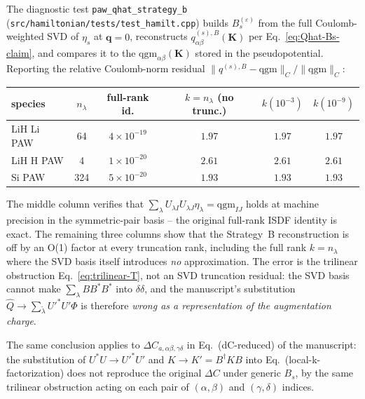 \documentclass[aps,prb,reprint,superscriptaddress,nofootinbib]{revtex4-2}
\newcommand{\bq}{\mathbf q}
\begin{document}
The diagnostic test \texttt{paw\_qhat\_strategy\_b}
(\texttt{src/hamiltonian/tests/test\_hamilt.cpp}) builds
\(B_s^{(\varepsilon)}\) from the full Coulomb-weighted SVD of
\(\eta_s\) at \(\bq=0\), reconstructs
\(q^{(s),B}_{\alpha\beta}(\mathbf K)\) per
Eq.~\eqref{eq:Qhat-Bs-claim}, and compares it to the
\(\mathrm{qgm}_{\alpha\beta}(\mathbf K)\) stored in the pseudopotential.
Reporting the relative Coulomb-norm residual
\(\bigl\|q^{(s),B}-\mathrm{qgm}\bigr\|_C/\bigl\|\mathrm{qgm}\bigr\|_C\):
\begin{table}[h]
\centering
\begin{tabular}{lccccc}
\hline
species & \(n_\lambda\) & full-rank id. & \(k=n_\lambda\) (no trunc.) & \(k(10^{-3})\) & \(k(10^{-9})\) \\
\hline
LiH Li PAW & 64  & \(4{\times}10^{-19}\) & \(\mathbf{1.97}\) & \(\mathbf{1.97}\) & \(\mathbf{1.97}\) \\
LiH H  PAW & 4   & \(1{\times}10^{-20}\) & \(\mathbf{2.61}\) & \(\mathbf{2.61}\) & \(\mathbf{2.61}\) \\
Si    PAW  & 324 & \(5{\times}10^{-20}\) & \(\mathbf{1.93}\) & \(\mathbf{1.93}\) & \(\mathbf{1.93}\) \\
\hline
\end{tabular}
\end{table}

The middle column verifies that
\(\sum_\lambda U_{\lambda I}U_{\lambda J}\eta_\lambda=\mathrm{qgm}_{IJ}\)
holds at machine precision in the symmetric-pair basis -- the original
full-rank ISDF identity is exact.  The remaining three columns show
that the Strategy~B reconstruction is off by an O(1) factor at every
truncation rank, including the full rank \(k=n_\lambda\) where the
SVD basis itself introduces \emph{no} approximation.  The error is the
trilinear obstruction Eq.~\eqref{eq:trilinear-T}, not an SVD truncation
residual: the SVD basis cannot make
\(\sum_\lambda B B^{*}B^{*}\) into \(\delta\delta\), and the
manuscript's substitution
\(\widehat Q\to\sum_{\widetilde\lambda}U'^{*}U'\Phi\) is therefore
\emph{wrong as a representation of the augmentation charge}.

The same conclusion applies to \(\Delta C_{a,\alpha\beta,\gamma\delta}\)
in Eq.~(dC-reduced) of the manuscript: the substitution of
\(U^{*}U\to U'^{*}U'\) and \(K\to K'=B^\dagger K B\) into
Eq.~(local-k-factorization) does not reproduce the original
\(\Delta C\) under generic \(B_s\), by the same trilinear obstruction
acting on each pair of \((\alpha,\beta)\) and \((\gamma,\delta)\)
indices.
\end{document}
